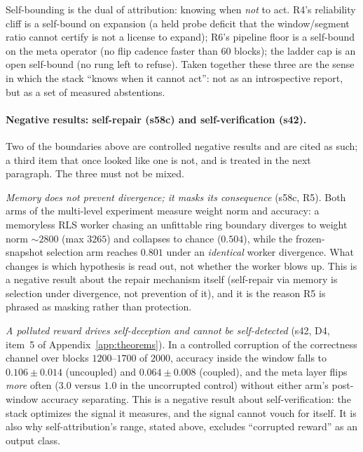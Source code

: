 \documentclass[preprint,12pt]{elsarticle}
\begin{document}
Self-bounding is the dual of attribution: knowing when \emph{not} to act.
R4's reliability cliff is a self-bound on expansion (a held probe deficit
that the window/segment ratio cannot certify is not a license to expand);
R6's pipeline floor is a self-bound on the meta operator (no flip cadence
faster than $60$ blocks); the ladder cap is an open self-bound (no rung left
to refuse). Taken together these three are the sense in which the stack
``knows when it cannot act'': not as an introspective report, but as a set
of measured abstentions.

\paragraph{Negative results: self-repair (s58c) and self-verification (s42).}
Two of the boundaries above are controlled negative results and are cited as
such; a third item that once looked like one is not, and is treated in the
next paragraph. The three must not be mixed.

\emph{Memory does not prevent divergence; it masks its consequence}
(s58c, R5). Both arms of the multi-level experiment measure weight norm and
accuracy: a memoryless RLS worker chasing an unfittable ring boundary
diverges to weight norm $\sim2800$ (max $3265$) and collapses to chance
($0.504$), while the frozen-snapshot selection arm reaches $0.801$ under an
\emph{identical} worker divergence. What changes is which hypothesis is read
out, not whether the worker blows up. This is a negative result about the
repair mechanism itself (self-repair via memory is selection under
divergence, not prevention of it), and it is the reason R5 is phrased as
masking rather than protection.

\emph{A polluted reward drives self-deception and cannot be self-detected}
(s42, D4, item~5 of Appendix~\ref{app:theorems}). In a controlled
corruption of the correctness channel over blocks $1200$--$1700$ of $2000$,
accuracy inside the window falls to $0.106\pm0.014$ (uncoupled) and
$0.064\pm0.008$ (coupled), and the meta layer flips \emph{more} often
($3.0$ versus $1.0$ in the uncorrupted control) without either arm's
post-window accuracy separating. This is a negative result about
self-verification: the stack optimizes the signal it measures, and the
signal cannot vouch for itself. It is also why self-attribution's range,
stated above, excludes ``corrupted reward'' as an output class.
\end{document}
